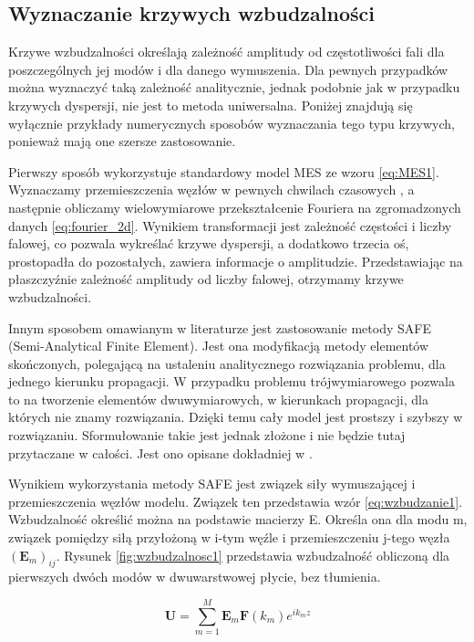 

\subsection{Wyznaczanie krzywych wzbudzalności}

Krzywe wzbudzalności określają zależność amplitudy od częstotliwości fali dla poszczególnych jej modów i dla danego wymuszenia. Dla pewnych przypadków można wyznaczyć taką zależność analitycznie, jednak podobnie jak w przypadku krzywych dyspersji, nie jest to metoda uniwersalna. Poniżej znajdują się wyłącznie przykłady numerycznych sposobów wyznaczania tego typu krzywych, ponieważ mają one szersze zastosowanie.

Pierwszy sposób wykorzystuje standardowy model MES ze wzoru \ref{eq:MES1}. Wyznaczamy przemieszczenia węzłów w pewnych chwilach czasowych , a następnie obliczamy wielowymiarowe przekształcenie Fouriera na zgromadzonych danych \ref{eq:fourier_2d}. Wynikiem transformacji jest zależność częstości i liczby falowej, co pozwala wykreślać krzywe dyspersji, a dodatkowo trzecia oś, prostopadła do pozostałych, zawiera informacje o amplitudzie. Przedstawiając na płaszczyźnie zależność amplitudy od liczby falowej, otrzymamy krzywe wzbudzalności.

\vspace{3mm}

Innym sposobem omawianym w literaturze jest zastosowanie metody SAFE (Semi-Analytical Finite Element). Jest ona modyfikacją metody elementów skończonych, polegającą na ustaleniu analitycznego rozwiązania problemu, dla jednego kierunku propagacji. W przypadku problemu trójwymiarowego pozwala to na tworzenie elementów dwuwymiarowych, w kierunkach propagacji, dla których nie znamy rozwiązania. Dzięki temu cały model jest prostszy i szybszy w rozwiązaniu. Sformułowanie takie jest jednak złożone i nie będzie tutaj przytaczane w całości. Jest ono opisane dokładniej w \cite{bartek_fabien}.

Wynikiem wykorzystania metody SAFE jest związek siły wymuszającej i przemieszczenia węzłów modelu. Związek ten przedstawia wzór \ref{eq:wzbudzanie1}. Wzbudzalność określić można na podstawie macierzy E. Określa ona dla modu m, związek pomiędzy siłą przyłożoną w i-tym węźle i przemieszczeniu j-tego węzła \( (\textbf{E}_m)_{ij} \). Rysunek \ref{fig:wzbudzalnosc1} przedstawia wzbudzalność obliczoną dla pierwszych dwóch modów w dwuwarstwowej płycie, bez tłumienia.

\begin{equation} \label{eq:wzbudzanie1}
\textbf{U} = \sum_{m=1}^M \textbf{E}_m \textbf{F}(k_m) e^{ik_m z}
\end{equation}

